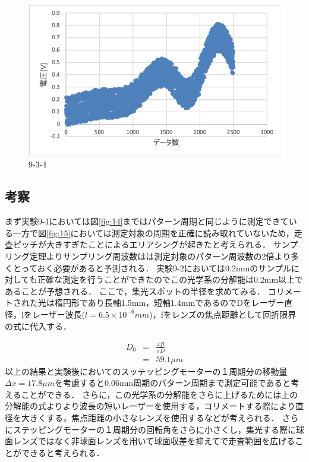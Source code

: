 \documentclass[11pt, a4paper,twocolumn]{jarticle}
\begin{document}
\begin{figure}[ht]
 \begin{center}
  \includegraphics[width=0.8\linewidth]{fig25.png}
 \end{center}
 \caption{9-3-4}
 \label{fig:25}
\end{figure}

\clearpage

\subsection{考察}
まず実験9-1においては図\ref{fig:14}まではパターン周期と同じように測定できている一方で図\ref{fig:15}においては測定対象の周期を正確に読み取れていないため，走査ピッチが大きすぎたことによるエリアシングが起きたと考えられる．
サンプリング定理よりサンプリング周波数はは測定対象のパターン周波数の2倍より多くとっておく必要があると予測される．
実験9-2においては0.2mmのサンプルに対しても正確な測定を行うことができたのでこの光学系の分解能は0.2mm以上であることが予想される．
ここで，集光スポットの半径を求めてみる．
コリメートされた光は楕円形であり長軸1.5mm，短軸1.4mmであるのでDをレーザー直径，lをレーザー波長($l=6.5\times{10^{-6}}mm$)，fをレンズの焦点距離として回折限界の式に代入する．

\begin{eqnarray}
    D_0 &=& \frac{4fl}{\pi D} \\
        &=& 59.1\mu m
\end{eqnarray}
以上の結果と実験後においてのスッテッピングモーターの１周期分の移動量$\Delta x = 17.8\mu m$を考慮すると0.06mm周期のパターン周期まで測定可能であると考えることができる．
さらに，この光学系の分解能をさらに上げるためには上の分解能の式よりより波長の短いレーザーを使用する，コリメートする際により直径を大きくする，焦点距離の小さなレンズを使用するなどが考えられる．
さらにステッピングモーターの１周期分の回転角をさらに小さくし，集光する際に球面レンズではなく非球面レンズを用いて球面収差を抑えてで走査範囲を広げることができると考えられる．
\newpage
\end{document}
